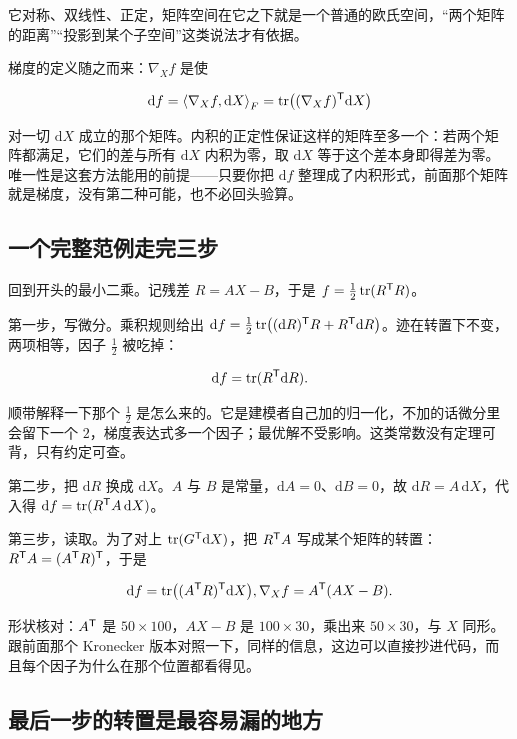 它对称、双线性、正定，矩阵空间在它之下就是一个普通的欧氏空间，``两个矩阵的距离''``投影到某个子空间''这类说法才有依据。

梯度的定义随之而来：\(\nabla_X f\) 是使

\[
\mathrm df=\left\langle\nabla_X f,\mathrm dX\right\rangle_F=\operatorname{tr}\bigl((\nabla_X f)^{\mathsf{T}}\mathrm dX\bigr)
\]

对一切 \(\mathrm dX\) 成立的那个矩阵。内积的正定性保证这样的矩阵至多一个：若两个矩阵都满足，它们的差与所有 \(\mathrm dX\) 内积为零，取 \(\mathrm dX\) 等于这个差本身即得差为零。唯一性是这套方法能用的前提——只要你把 \(\mathrm df\) 整理成了内积形式，前面那个矩阵就是梯度，没有第二种可能，也不必回头验算。

\subsection{一个完整范例走完三步}

回到开头的最小二乘。记残差 \(R=AX-B\)，于是 \(f=\tfrac12\operatorname{tr}(R^{\mathsf{T}}R)\)。

第一步，写微分。乘积规则给出 \(\mathrm df=\tfrac12\operatorname{tr}\bigl((\mathrm dR)^{\mathsf{T}}R+R^{\mathsf{T}}\mathrm dR\bigr)\)。迹在转置下不变，两项相等，因子 \(\tfrac12\) 被吃掉：

\[
\mathrm df=\operatorname{tr}(R^{\mathsf{T}}\mathrm dR).
\]

顺带解释一下那个 \(\tfrac12\) 是怎么来的。它是建模者自己加的归一化，不加的话微分里会留下一个 \(2\)，梯度表达式多一个因子；最优解不受影响。这类常数没有定理可背，只有约定可查。

第二步，把 \(\mathrm dR\) 换成 \(\mathrm dX\)。\(A\) 与 \(B\) 是常量，\(\mathrm dA=0\)、\(\mathrm dB=0\)，故 \(\mathrm dR=A\,\mathrm dX\)，代入得 \(\mathrm df=\operatorname{tr}(R^{\mathsf{T}}A\,\mathrm dX)\)。

第三步，读取。为了对上 \(\operatorname{tr}(G^{\mathsf{T}}\mathrm dX)\)，把 \(R^{\mathsf{T}}A\) 写成某个矩阵的转置：\(R^{\mathsf{T}}A=(A^{\mathsf{T}}R)^{\mathsf{T}}\)，于是

\[
\mathrm df=\operatorname{tr}\bigl((A^{\mathsf{T}}R)^{\mathsf{T}}\mathrm dX\bigr),
\space
\nabla_X f=A^{\mathsf{T}}(AX-B).
\]

形状核对：\(A^{\mathsf{T}}\) 是 \(50\times 100\)，\(AX-B\) 是 \(100\times 30\)，乘出来 \(50\times 30\)，与 \(X\) 同形。跟前面那个 Kronecker 版本对照一下，同样的信息，这边可以直接抄进代码，而且每个因子为什么在那个位置都看得见。

\subsection{最后一步的转置是最容易漏的地方}

